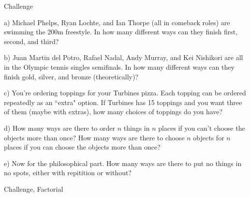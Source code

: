 \begin{tagblock}{Challenge}
\begin{question}[CHALLENGE!!!]
	

a) Michael Phelps, Ryan Lochte, and Ian Thorpe (all in comeback roles) are swimming the 200m freestyle. In how many different ways can they finish first, second, and third?

\bigskip

b) Juan Martin del Potro, Rafael Nadal, Andy Murray, and Kei Nishikori are all in the Olympic tennis singles semifinals. In how many different ways can they finish gold, silver, and bronze (theoretically)?

\bigskip

c) You're ordering toppings for your Turbines pizza. Each topping can be ordered repeatedly as an ``extra" option. If Turbines has 15 toppings and you want three of them (maybe with extras), how many choices of toppings do you have?

\bigskip

d) How many ways are there to order $n$ things in $n$ places if you can't choose the objects more than once? How many ways are there to choose $n$ objects for $n$ places if you can choose the objects more than once?

\bigskip

e) Now for the philosophical part. How many ways are there to put no things in no spots, either with repitition or without?
	
	
\begin{tags}
	    Challenge, Factorial
\end{tags}
	
\begin{diary}
\end{diary}
		
\begin{solution}
       
\end{solution}

\end{question}

\end{tagblock}

